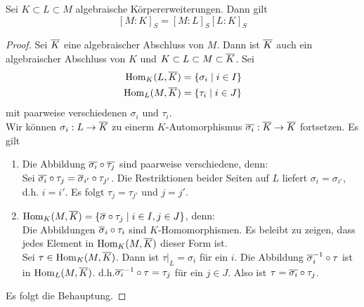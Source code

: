 	\begin{theorem}
		Sei $K\subset L\subset M$ algebraische Körpererweiterungen. Dann gilt\[[M:K]_S=[M:L]_S[L:K]_S\]
	\end{theorem}
	\begin{proof}
		Sei $\overline{K}$ eine algebraischer Abschluss von $M$. Dann ist $\overline{K}$ auch ein algebraischer Abschluss von $K$ und $K\subset L\subset M\subset\overline{K}$. Sei
		\begin{align*}
		\operatorname{Hom}_K(L,\overline{K})&=\{\sigma_i\mid i\in I\}\\
		\operatorname{Hom}_L(M,\overline{K})&=\{\tau_i\mid i\in J\}\\
		\end{align*}
		mit paarweise verschiedenen $\sigma_i$ und $\tau_i$.\\
		Wir können $\sigma_i:L\to\overline{K}$ zu einerm $K$-Automorphismus $\overline{\sigma_i}:\overline{K}\to\overline{K}$ fortsetzen. Es gilt
		\begin{enumerate}
			\item Die Abbildung $\overline{\sigma_i}\circ\overline{\tau_j}$ sind paarweise verschiedene, denn:\\
			Sei $\overline{\sigma_i}\circ \tau_j=\overline{\sigma}_{i'}\circ\tau_{j'}$. Die Restriktionen beider Seiten auf $L$ liefert $\sigma_i=\sigma_{i'}$, d.h. $i=i'$. Es folgt $\tau_j=\tau_{j'}$ und $j=j'$.
			\item $\operatorname{Hom}_K(M,\overline{K})=\{\overline{\sigma}\circ \tau_j\mid i\in I,j\in J\}$, denn:\\
			Die Abbildungen $\overline{\sigma}_i\circ \tau_i$ sind $K$-Homomorphismen. Es beleibt zu zeigen, dass jedes Element in $\operatorname{Hom}_K(M,\overline{K})$ dieser Form ist.\\
			Sei $\tau\in\operatorname{Hom}_K(M,\overline{K})$. Dann ist $\tau|_L=\sigma_i$ für ein $i$. Die Abbildung $\overline{\sigma}_i^{-1}\circ \tau$ ist in $\operatorname{Hom}_L(M,\overline{K})$. d.h.$\overline{\sigma_i}^{-1}\circ\tau=\tau_j$ für ein $j\in J$. Also ist $\tau=\overline{\sigma_i}\circ\tau_j$.
		\end{enumerate}
	Es folgt die Behauptung.
	\end{proof}

